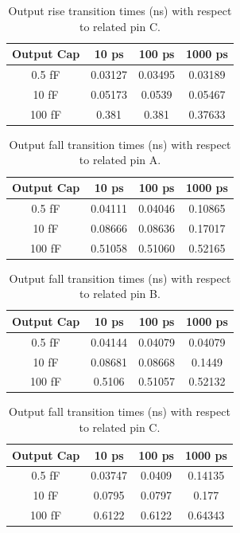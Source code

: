 \documentclass[12pt]{article}
\begin{document}
\begin{table}[H]
	\centering
	\begin{tabular}{|c|c|c|c|}
		\hline
		Output Cap & 10 ps   & 100 ps  & 1000 ps \\
		\hline
		0.5 fF     & 0.03127 & 0.03495 & 0.03189 \\
		10 fF      & 0.05173 & 0.0539  & 0.05467 \\
		100 fF     & 0.381   & 0.381   & 0.37633 \\
		\hline
	\end{tabular}
	\caption{Output rise transition times (ns) with respect to related pin C.}
	\label{tab:rise_trans_C}
\end{table}


\begin{table}[H]
	\centering
	\begin{tabular}{|c|c|c|c|}
		\hline
		Output Cap & 10 ps   & 100 ps  & 1000 ps \\
		\hline
		0.5 fF     & 0.04111 & 0.04046 & 0.10865 \\
		10 fF      & 0.08666 & 0.08636 & 0.17017 \\
		100 fF     & 0.51058 & 0.51060 & 0.52165 \\
		\hline
	\end{tabular}
	\caption{Output fall transition times (ns) with respect to related pin A.}
	\label{tab:fall_trans_A}
\end{table}

\begin{table}[H]
	\centering
	\begin{tabular}{|c|c|c|c|}
		\hline
		Output Cap & 10 ps   & 100 ps  & 1000 ps \\
		\hline
		0.5 fF     & 0.04144 & 0.04079 & 0.04079 \\
		10 fF      & 0.08681 & 0.08668 & 0.1449  \\
		100 fF     & 0.5106  & 0.51057 & 0.52132 \\
		\hline
	\end{tabular}
	\caption{Output fall transition times (ns) with respect to related pin B.}
	\label{tab:fall_trans_B}
\end{table}

\begin{table}[H]
	\centering
	\begin{tabular}{|c|c|c|c|}
		\hline
		Output Cap & 10 ps   & 100 ps & 1000 ps \\
		\hline
		0.5 fF     & 0.03747 & 0.0409 & 0.14135 \\
		10 fF      & 0.0795  & 0.0797 & 0.177   \\
		100 fF     & 0.6122  & 0.6122 & 0.64343 \\
		\hline
	\end{tabular}
	\caption{Output fall transition times (ns) with respect to related pin C.}
	\label{tab:fall_trans_C}
\end{table}
\end{document}
